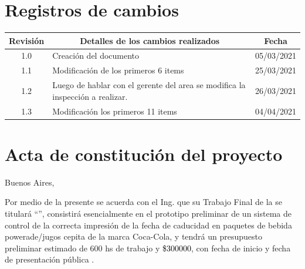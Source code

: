 \documentclass[11pt]{charter}
\begin{document}
\maketitle
\thispagestyle{empty}
\pagebreak


\thispagestyle{empty}
{\setlength{\parskip}{0pt}
\tableofcontents{}
}
\pagebreak


\section{Registros de cambios}
\label{sec:registro}


\begin{table}[ht]
\label{tab:registro}
\centering
\begin{tabularx}{\linewidth}{@{}|c|X|c|@{}}
\hline
\rowcolor[HTML]{C0C0C0} 
Revisión & \multicolumn{1}{c|}{\cellcolor[HTML]{C0C0C0}Detalles de los cambios realizados} & Fecha      \\ \hline
1.0      & Creación del documento                                          & 05/03/2021\\ \hline
1.1      & Modificación de los primeros 6 items                                      
& 25/03/2021 \\ \hline
1.2      & Luego de hablar con el gerente del area se modifica la inspección\newline
a realizar.
& 26/03/2021 \\ \hline
1.3		 & Modificación los primeros 11 items  
& 04/04/2021 \\ \hline
\end{tabularx}
\end{table}

\pagebreak



\section{Acta de constitución del proyecto}
\label{sec:acta}

\begin{flushright}
Buenos Aires, \fechaInicioName
\end{flushright}

\vspace{2cm}

Por medio de la presente se acuerda con el Ing. \authorname\hspace{1px} que su Trabajo Final de la \degreename\hspace{1px} se titulará ``\ttitle'', consistirá esencialmente en el prototipo preliminar de un sistema de control de la correcta impresión de la fecha de caducidad en paquetes de bebida powerade/jugos cepita de la marca Coca-Cola, y tendrá un presupuesto preliminar estimado de 600 hs de trabajo y \textcolor{black}{\$300000}, con fecha de inicio \fechaInicioName\hspace{1px} y fecha de presentación pública \fechaFinalName.
\end{document}
